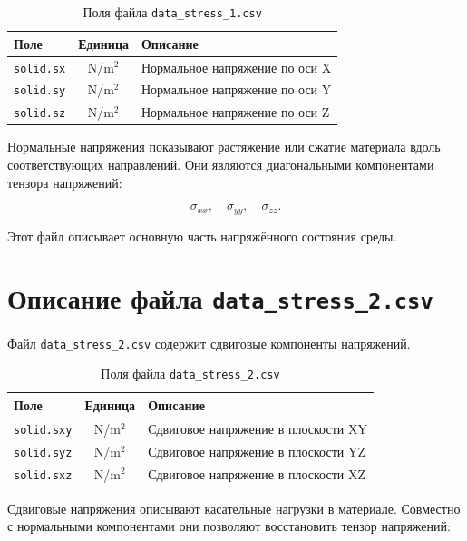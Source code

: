 \begin{table}[h!]
\centering
\caption{Поля файла \texttt{data\_stress\_1.csv}}
\label{tab:data_stress_1}
\begin{tabular}{|l|c|p{8cm}|}
\hline
\textbf{Поле} & \textbf{Единица} & \textbf{Описание} \\
\hline
\texttt{solid.sx} & N/m$^2$ & Нормальное напряжение по оси X \\
\hline
\texttt{solid.sy} & N/m$^2$ & Нормальное напряжение по оси Y \\
\hline
\texttt{solid.sz} & N/m$^2$ & Нормальное напряжение по оси Z \\
\hline
\end{tabular}
\end{table}

Нормальные напряжения показывают растяжение или сжатие материала вдоль соответствующих направлений. Они являются диагональными компонентами тензора напряжений:

\begin{equation}
\sigma_{xx}, \quad \sigma_{yy}, \quad \sigma_{zz}.
\end{equation}

Этот файл описывает основную часть напряжённого состояния среды.

\section{Описание файла \texttt{data\_stress\_2.csv}}

Файл \texttt{data\_stress\_2.csv} содержит сдвиговые компоненты напряжений.

\begin{table}[h!]
\centering
\caption{Поля файла \texttt{data\_stress\_2.csv}}
\label{tab:data_stress_2}
\begin{tabular}{|l|c|p{8cm}|}
\hline
\textbf{Поле} & \textbf{Единица} & \textbf{Описание} \\
\hline
\texttt{solid.sxy} & N/m$^2$ & Сдвиговое напряжение в плоскости XY \\
\hline
\texttt{solid.syz} & N/m$^2$ & Сдвиговое напряжение в плоскости YZ \\
\hline
\texttt{solid.sxz} & N/m$^2$ & Сдвиговое напряжение в плоскости XZ \\
\hline
\end{tabular}
\end{table}

Сдвиговые напряжения описывают касательные нагрузки в материале. Совместно с нормальными компонентами они позволяют восстановить тензор напряжений:


